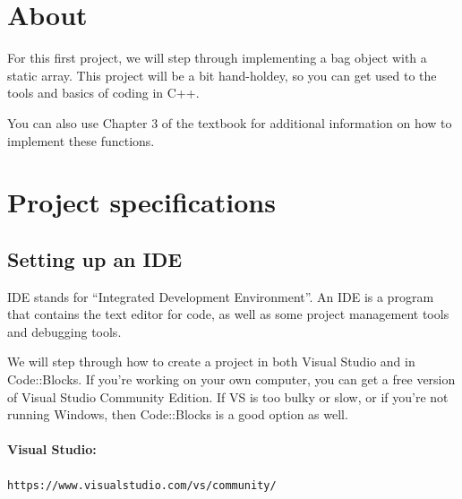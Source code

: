 
\newcommand{\laClass}       {CS 250}
\newcommand{\laSemester}    {Spring 2018}
\newcommand{\laChapter}     {}
\newcommand{\laType}        {Project}
\newcommand{\laAssignment}  {1}
\newcommand{\laPoints}      {5}
\newcommand{\laTitle}       {Bag ADT}
\newcommand{\laStarterFiles}{Download from GitHub.}
\newcommand{\laTopics}      {Data structures, array implementations}
\setcounter{chapter}{1}
\setcounter{section}{1}
\addtocounter{section}{-1}
\toggletrue{answerkey}
\togglefalse{answerkey}




    \section{About}

        For this first project, we will step through implementing
        a bag object with a static array. This project will be a bit
        hand-holdey, so you can get used to the tools and basics of
        coding in C++.

        You can also use Chapter 3 of the textbook for additional information
        on how to implement these functions.

    \section{Project specifications}

        \subsection{Setting up an IDE}

            IDE stands for ``Integrated Development Environment''. An IDE
            is a program that contains the text editor for code, as well
            as some project management tools and debugging tools.

            We will step through how to create a project in both Visual Studio
            and in Code::Blocks. If you're working on your own computer,
            you can get a free version of Visual Studio Community Edition. If
            VS is too bulky or slow, or if you're not running Windows, then
            Code::Blocks is a good option as well.

            \paragraph{Visual Studio:}
                \texttt{https://www.visualstudio.com/vs/community/}

